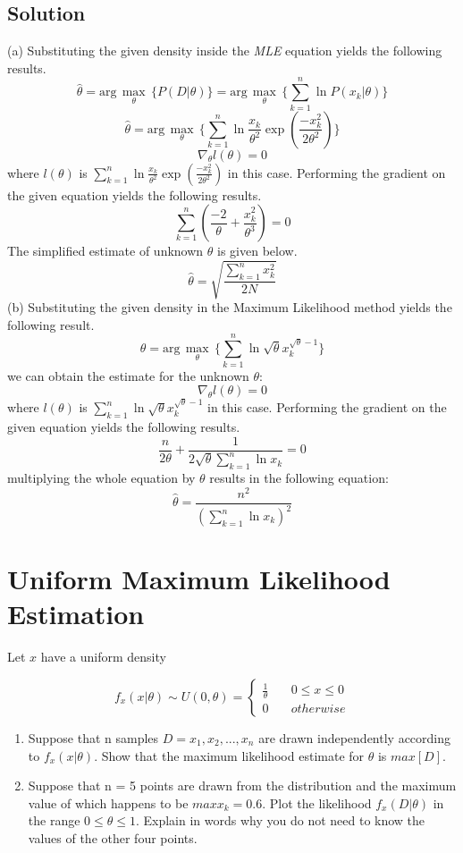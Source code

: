\documentclass[12pt]{article}
\numberwithin{equation}{section}
\numberwithin{table}{section}
\numberwithin{figure}{section}
\begin{document}
\subsection*{Solution}
(a) Substituting the given density inside the \textit{MLE} equation yields the following results.
\begin{equation}
	\hat{\theta} = \text{arg}\,\max\limits_{\theta}\, \{P(D|\theta)\} = \text{arg}\,\max\limits_{\theta}\, \{\sum_{k = 1}^{n} \ln P(x_k|\theta)\} 
\end{equation}
$$
	\hat{\theta} = \text{arg}\,\max\limits_{\theta}\, \{\sum_{k = 1}^{n} \ln \frac{x_k}{\theta^2}\exp(\frac{-x_k^2}{2\theta^2})\}
$$
$$
	\nabla_{\theta}l(\theta) = 0 
$$
where $l(\theta)$ is $\sum_{k = 1}^{n} \ln \frac{x_k}{\theta^2}\exp(\frac{-x_k^2}{2\theta^2})$ in this case. Performing the gradient on the given equation yields the following results.
$$
	\sum_{k = 1}^{n} (\frac{-2}{\theta} + \frac{x_k^2}{\theta^3}) = 0
$$
The simplified estimate of unknown $\theta$ is given below.
$$
	\hat{\theta} = \sqrt{\frac{\sum_{k = 1}^{n} x_k^2}{2N}}
$$
(b) Substituting the given density in the Maximum Likelihood method yields the following result.
\begin{equation}
	\hat{\theta} = \text{arg}\,\max\limits_{\theta}\, \{\sum_{k = 1}^{n} \ln \sqrt{\theta}x_k^{\sqrt{\theta} - 1}\}
\end{equation}
we can obtain the estimate for the unknown $\theta$:
$$
	\nabla_{\theta}l(\theta) = 0 
$$
where $l(\theta)$ is $\sum_{k = 1}^{n} \ln \sqrt{\theta}x_k^{\sqrt{\theta} - 1}$ in this case. Performing the gradient on the given equation yields the following results.
$$
	\frac{n}{2\theta} + \frac{1}{2\sqrt{\theta}\sum_{k = 1}^{n}\ln x_k} = 0
$$
multiplying the whole equation by $\theta$ results in the following equation:
$$
	\hat{\theta} = \frac{n^2}{(\sum_{k = 1}^{n}\ln x_k)^2}
$$

\section{Uniform Maximum Likelihood Estimation}
Let $x$ have a uniform density

	\[ f_x(x|\theta) \sim U(0, \theta) = 
	\begin{cases}
	\frac{1}{\theta}       & \quad 0 \leq x \leq 0\\
	0  & \quad otherwise
	\end{cases}
	\]
	
\begin{enumerate}[label=(\alph*)]
	\item Suppose that n samples $ D = {x_1, x_2, ..., x_n}$ are drawn independently according to $f_x(x|\theta)$. Show that the maximum likelihood estimate for $\theta$ is $max[D]$.
	\item Suppose that n = 5 points are drawn from the distribution and the maximum value of which happens to be $max{x_k} = 0.6$. Plot the likelihood $f_x(D|\theta)$ in the range $0 \leq \theta \leq 1$. Explain in words why you do not need to know the values of the other four points.
\end{enumerate}
\end{document}
